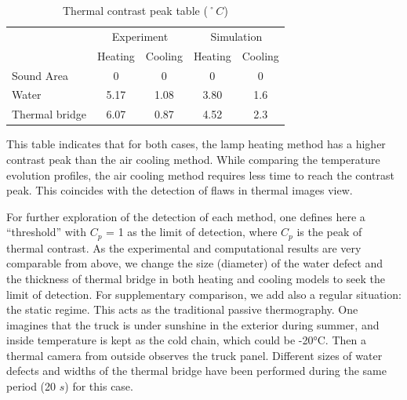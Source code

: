 \documentclass{tQRT2e}
\begin{document}
\begin{table}[ht]
	\centering
	\caption{Thermal contrast peak table ($˚C$)}
	\begin{tabular}{l|cc|cc}
		\hline
		& \multicolumn{2}{c|}{Experiment} & \multicolumn{2}{c}{Simulation} \\
		 & Heating & Cooling & Heating & Cooling \\
		\hline
		Sound Area & 0 & 0 & 0 & 0 \\
		Water & 5.17 & 1.08 & 3.80 & 1.6 \\
		Thermal bridge & 6.07 & 0.87 & 4.52 & 2.3 \\  
		\hline
	\end{tabular}
	\label{tab_TCP}
\end{table}
This table indicates that for both cases, the lamp heating method has a higher contrast peak than the air cooling method. While comparing the temperature evolution profiles, the air cooling method requires less time to reach the contrast peak. This coincides with the detection of flaws in thermal images view.

For further exploration of the detection of each method, one defines here a “threshold” with $C_p$ = 1 as the limit of detection, where $C_p$ is the peak of thermal contrast. As the experimental and computational results are very comparable from above, we change the size (diameter) of the water defect and the thickness of thermal bridge in both heating and cooling models to seek the limit of detection. For supplementary comparison, we add also a regular situation: the static regime. This acts as the traditional passive thermography. One imagines that the truck is under sunshine in the exterior during summer, and inside temperature is kept as the cold chain, which could be -20°C. Then a thermal camera from outside observes the truck panel. Different sizes of water defects and widths of the thermal bridge have been performed during the same period (20 $s$) for this case.
\end{document}
